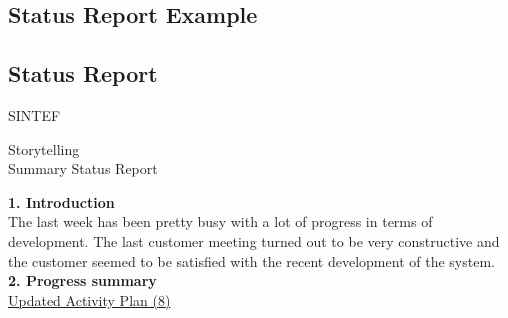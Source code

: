 \documentclass[12pt,a4paper,titlepage]{article}
\begin{document}
\newpage
\pagestyle{plain}
\begin{appendices}




\section{Status Report Example}
\subsection{Status Report}

\newpage
\thispagestyle{plain}

SINTEF\\
\begin{centering}
Storytelling\\
\huge{Summary Status Report}\\
\end{centering}

\vspace{1cm}
\textbf{1. Introduction}\\

The last week has been pretty busy with a lot of progress in terms of development. The last customer meeting turned out to be very constructive and the customer seemed to be satisfied with the recent development of the system.\\[6pt]

\textbf{2. Progress summary}\\

\href{https://docs.google.com/spreadsheet/ccc?key=0Aigjd3Z4fa8YdGhtR0tqN0d4Q19TR0FmQ2pTVTR1X1E&usp=drive_web#gid=0}{Updated Activity Plan (8)}


\end{appendices}
\end{document}
